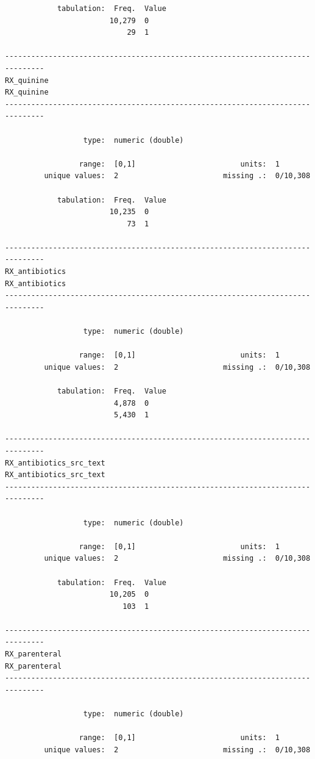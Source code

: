 \documentclass[
  letterpaper,
  DIV=11,
  numbers=noendperiod]{scrreprt}
\begin{document}
\begin{verbatim}
            tabulation:  Freq.  Value
                        10,279  0
                            29  1

-------------------------------------------------------------------------------
RX_quinine                                                           RX_quinine
-------------------------------------------------------------------------------

                  type:  numeric (double)

                 range:  [0,1]                        units:  1
         unique values:  2                        missing .:  0/10,308

            tabulation:  Freq.  Value
                        10,235  0
                            73  1

-------------------------------------------------------------------------------
RX_antibiotics                                                   RX_antibiotics
-------------------------------------------------------------------------------

                  type:  numeric (double)

                 range:  [0,1]                        units:  1
         unique values:  2                        missing .:  0/10,308

            tabulation:  Freq.  Value
                         4,878  0
                         5,430  1

-------------------------------------------------------------------------------
RX_antibiotics_src_text                                 RX_antibiotics_src_text
-------------------------------------------------------------------------------

                  type:  numeric (double)

                 range:  [0,1]                        units:  1
         unique values:  2                        missing .:  0/10,308

            tabulation:  Freq.  Value
                        10,205  0
                           103  1

-------------------------------------------------------------------------------
RX_parenteral                                                     RX_parenteral
-------------------------------------------------------------------------------

                  type:  numeric (double)

                 range:  [0,1]                        units:  1
         unique values:  2                        missing .:  0/10,308


\end{verbatim}
\end{document}
